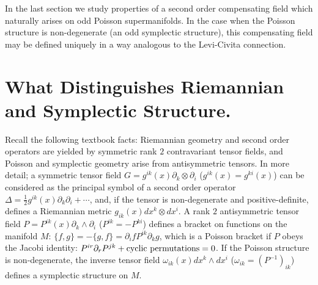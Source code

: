 \documentclass[12pt,reqno,a4paper]{amsart}
\theoremstyle{definition}
\begin{document}
In the last section we study properties of a second order compensating field
which naturally arises on odd Poisson supermanifolds.
In the case when the Poisson structure is non-degenerate
(an odd symplectic structure), this compensating field may be
defined uniquely in a way analogous to the Levi-Civita connection.

\section{What Distinguishes Riemannian and Symplectic Structure.}
Recall the following textbook facts: Riemannian geometry and
second order operators are yielded by symmetric rank $2$ contravariant
tensor fields, and Poisson and symplectic geometry arise from antisymmetric
tensors. In more detail; a symmetric tensor field
$G = g^{ik}(x){\partial}_k\otimes {\partial}_i$
($g^{ik}(x)=g^{ki}(x)$) can be considered as the principal symbol of a
second order operator $\Delta = \frac{1}{2}g^{ik}(x){\partial}_k{\partial}_i + \cdots$,
and, if the tensor is non-degenerate and positive-definite,
defines a Riemannian
metric $g_{ik}(x)dx^k\otimes dx^i$. A rank $2$ antisymmetric tensor field
$P = P^{ik}(x){\partial}_k\wedge{\partial}_i$ ($P^{ik}=-P^{ki}$) defines a bracket on
functions on the manifold $M$: $\{f,g\} = -\{g,f\}={\partial}_ifP^{ik}{\partial}_kg$,
which is a
Poisson bracket if $P$ obeys the Jacobi identity:
$P^{ir}{\partial}_r P^{jk}+\hbox{cyclic permutations}=0$.
If the Poisson structure is non-degenerate,
the inverse tensor field ${\omega}_{ik}(x)dx^k\wedge dx^i$
(${\omega}_{ik}={(P^{-1})}_{ik}$)
defines a symplectic structure on $M$.
\end{document}
